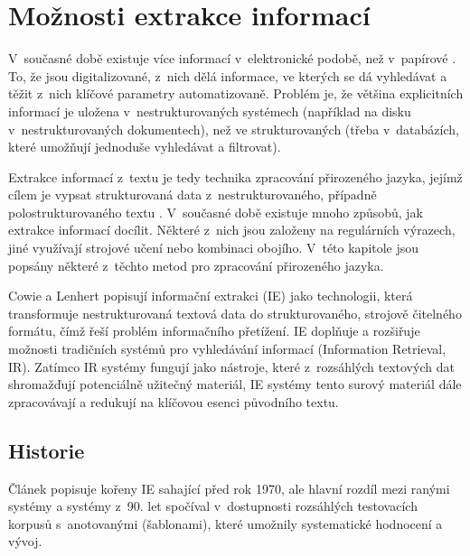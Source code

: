 \documentclass[czech, bc, kiv, he, iso690numb, pdf]{fasthesis}
\begin{document}
\chapter{Možnosti extrakce informací}
V~současné době existuje více informací v~elektronické podobě, než v~papírové \cite{information-extraction}. To, že jsou digitalizované, z~nich dělá informace, ve kterých se dá vyhledávat a těžit z~nich klíčové parametry automatizovaně. Problém je, že většina explicitních informací je uložena v~nestrukturovaných systémech (například na disku v~nestrukturovaných dokumentech), než ve strukturovaných (třeba v~databázích, které umožňují jednoduše vyhledávat a filtrovat).

Extrakce informací z~textu je tedy technika zpracování přirozeného jazyka, jejímž cílem je vypsat strukturovaná data z~nestrukturovaného, případně polostrukturovaného textu \cite{llm-with-nlp-long-docs-info-extraction}. V~současné době existuje mnoho způsobů, jak extrakce informací docílit. Některé z~nich jsou založeny na regulárních výrazech, jiné využívají strojové učení nebo kombinaci obojího. V~této kapitole jsou popsány některé z~těchto metod pro zpracování přirozeného jazyka.

Cowie a Lenhert \cite{information-extraction} popisují informační extrakci (IE) jako technologii, která transformuje nestrukturovaná textová data do strukturovaného, strojově čitelného formátu, čímž řeší problém informačního přetížení. IE doplňuje a rozšiřuje možnosti tradičních systémů pro vyhledávání informací (Information Retrieval, IR). Zatímco IR systémy fungují jako nástroje, které z~rozsáhlých textových dat shromažďují potenciálně užitečný materiál, IE systémy tento surový materiál dále zpracovávají a redukují na klíčovou esenci původního textu.


\section{Historie}
Článek \cite{information-extraction} popisuje kořeny IE sahající před rok 1970, ale hlavní rozdíl mezi ranými systémy a systémy z~90. let spočíval v~dostupnosti rozsáhlých testovacích korpusů s~anotovanými  (šablonami), které umožnily systematické hodnocení a vývoj.
\end{document}
